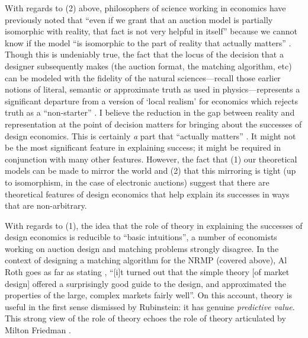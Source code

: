 With regards to (2) above, philosophers of science working in economics have previously noted that ``even if we grant that an auction model is partially isomorphic with reality, that fact is not very helpful in itself'' because we cannot know if the model ``is isomorphic to the part of reality that actually matters'' \autocite[309]{alexandrova2009}. Though this is undeniably true, the fact that the locus of the decision that a designer subsequently makes (the auction format, the matching algorithm, etc) can be modeled with the fidelity of the natural sciences---recall those earlier notions of literal, semantic or approximate truth as used in physics---represents a significant departure from a version of `local realism' for economics which rejects truth as a ``non-starter'' \autocite[above]{alexandrova2009}. I believe the reduction in the gap between reality and representation at the point of decision matters for bringing about the successes of design economics. This is certainly \textit{a} part that ``actually matters'' \autocite[above]{alexandrova2009}. It might not be the most significant feature in explaining success; it might be required in conjunction with many other features. However, the fact that (1) our theoretical models can be made to mirror the world and (2) that this mirroring is tight (up to isomorphism, in the case of electronic auctions) suggest that there are theoretical features of design economics that help explain its successes in ways that are non-arbitrary.

With regards to (1), the idea that the role of theory in explaining the successes of design economics is reducible to ``basic intuitions'', a number of economists working on auction design and matching problems strongly disagree. In the context of designing a matching algorithm for the NRMP (covered above), Al Roth goes as far as stating \autocite[1372]{roth2002}, ``[i]t turned out that the simple theory [of market design] offered a surprisingly good guide to the design, and approximated the properties of the large, complex markets fairly well''. On this account, theory is useful in the first sense dismissed by Rubinstein: it has genuine \textit{predictive value}. This strong view of the role of theory echoes the role of theory articulated by Milton Friedman \autocite*{friedman1953}. 

